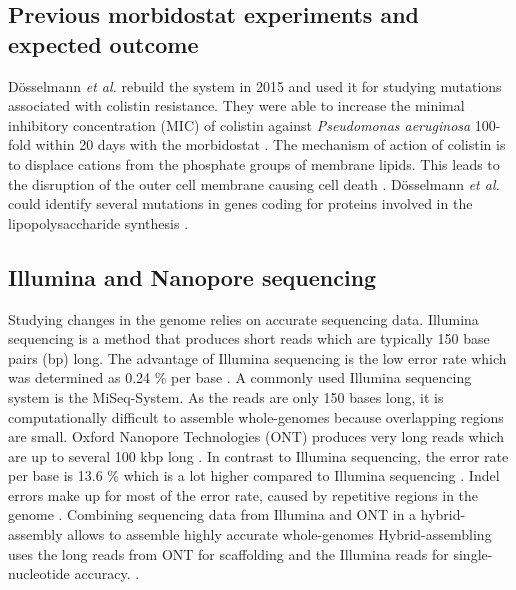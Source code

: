 \subsection{Previous morbidostat experiments and expected outcome}
Dösselmann \textit{et al.} rebuild the system in 2015  \cite{doselmann_rapid_2017} and used it for studying mutations associated with colistin resistance. They were able to increase the minimal inhibitory concentration (MIC) of colistin against \textit{Pseudomonas aeruginosa} 100-fold within 20 days with the morbidostat \cite{doselmann_rapid_2017}. The mechanism of action of colistin is to displace cations from the phosphate groups of membrane lipids. This leads to the disruption of the outer cell membrane causing cell death \cite{noauthor_colistin:_nodate}. Dösselmann \textit{et al.} could identify several mutations in genes coding for proteins involved in the lipopolysaccharide synthesis \cite{doselmann_rapid_2017}.

\subsection{Illumina and Nanopore sequencing}
Studying changes in the genome relies on accurate sequencing data. Illumina sequencing is a method that produces short reads which are typically 150 base pairs (bp) long. The advantage of Illumina sequencing is the low error rate which was determined as 0.24 \% per base \cite{pfeiffer_systematic_2018}. A commonly used Illumina sequencing system is the MiSeq-System. As the reads are only 150 bases long, it is computationally difficult to assemble whole-genomes because overlapping regions are small.  
Oxford Nanopore Technologies (ONT) produces very long reads which are up to several 100 kbp long \cite{noauthor_resolving_nodate}. In contrast to Illumina sequencing, the error rate per base is 13.6 \% which is a lot higher compared to Illumina sequencing \cite{noauthor_resolving_nodate}. Indel errors make up for most of the error rate, caused by repetitive regions in the genome \cite{noauthor_resolving_nodate}. Combining sequencing data from Illumina and ONT in a hybrid-assembly allows to assemble highly accurate whole-genomes Hybrid-assembling uses the long reads from ONT for scaffolding and the Illumina reads for single-nucleotide accuracy. \cite{noauthor_resolving_nodate}.

